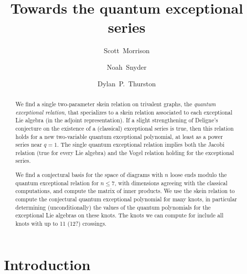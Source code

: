 \documentclass[12pt]{amsart}
\begin{document}
\title{Towards the quantum exceptional series}

\author[Morrison]{Scott~Morrison}
\address{Mathematical Sciences Institute, Australian National University}

\author[Snyder]{Noah~Snyder}
\address{Bloomington, Indiana, USA}

\author[Thurston]{Dylan~P.~Thurston}
\address{Bloomington, Indiana, USA}

\begin{abstract}
  We find a single two-parameter skein relation on trivalent graphs,
  the \emph{quantum exceptional relation}, that specializes to a skein
  relation associated to each exceptional Lie algebra (in the adjoint
  representation). If a slight
  strengthening of Deligne's conjecture on the existence of a
  (classical) exceptional series is true, then this relation
  holds for a new two-variable quantum exceptional polynomial, at
  least as a power series near $q=1$. The
  single quantum exceptional relation implies both the
  Jacobi relation (true for every Lie algebra) and
  the Vogel relation holding for the exceptional series.

  We find a conjectural basis for the space of diagrams with $n$ loose
  ends modulo the quantum exceptional relation for $n \le 7$, with
  dimensions agreeing with the classical computations, and compute
  the matrix of inner products. 
  We use the
  skein relation to compute the conjectural quantum exceptional
  polynomial for many knots, in particular
  determining (unconditionally) the values of the quantum polynomials
  for the exceptional Lie algebras on
  these knots. The knots we can compute for include all knots with up
  to 11 (12?) crossings.
\end{abstract}


\maketitle

\tableofcontents

\section{Introduction}
\label{sec:introduction}
\end{document}
